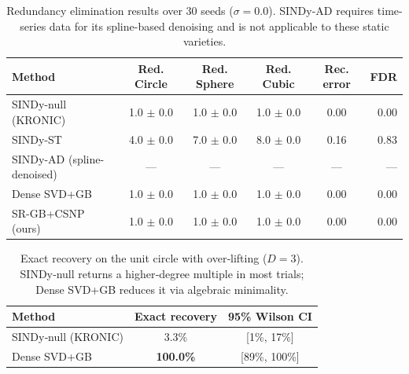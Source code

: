 \documentclass{article}
\begin{document}

\begin{table}[ht]
\centering
\caption{Redundancy elimination results over 30 seeds ($\sigma=0.0$). SINDy-AD requires time-series data for its spline-based denoising and is not applicable to these static varieties.}
\label{tab:synthetic}
\begin{tabular}{lccccr}
\toprule
\textbf{Method} & \textbf{Red. Circle} & \textbf{Red. Sphere} & \textbf{Red. Cubic} & \textbf{Rec. error} & \textbf{FDR} \\
\midrule
SINDy-null (KRONIC) & 1.0 $\pm$ 0.0 & 1.0 $\pm$ 0.0 & 1.0 $\pm$ 0.0 & 0.00 & 0.00 \\
SINDy-ST & 4.0 $\pm$ 0.0 & 7.0 $\pm$ 0.0 & 8.0 $\pm$ 0.0 & 0.16 & 0.83 \\
SINDy-AD (spline-denoised) & --- & --- & --- & --- & --- \\
Dense SVD+GB & 1.0 $\pm$ 0.0 & 1.0 $\pm$ 0.0 & 1.0 $\pm$ 0.0 & 0.00 & 0.00 \\
SR-GB+CSNP (ours) & 1.0 $\pm$ 0.0 & 1.0 $\pm$ 0.0 & 1.0 $\pm$ 0.0 & 0.00 & 0.00 \\
\bottomrule
\end{tabular}
\end{table}


\begin{table}[ht]
\centering
\caption{Exact recovery on the unit circle with over‑lifting ($D=3$). SINDy‑null returns a higher‑degree multiple in most trials; Dense SVD+GB reduces it via algebraic minimality.}
\label{tab:overlifting}
\begin{tabular}{lcc}
\toprule
\textbf{Method} & \textbf{Exact recovery} & \textbf{95\% Wilson CI} \\
\midrule
SINDy‑null (KRONIC) & 3.3\% & [1\%, 17\%] \\
Dense SVD+GB & \textbf{100.0\%} & [89\%, 100\%] \\
\bottomrule
\end{tabular}
\end{table}
\end{document}
